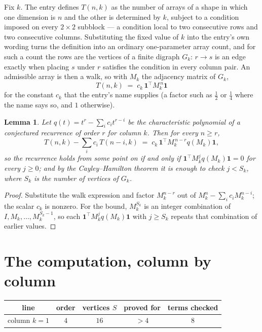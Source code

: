 \documentclass[11pt,a4paper]{article}
\theoremstyle{plain}
\newtheorem{lemma}[theorem]{Lemma}
\theoremstyle{definition}
\begin{document}
Fix $k$. The entry defines $T(n,k)$ as the number of arrays of a shape in which one dimension
is $n$ and the other is determined by $k$, subject to a condition imposed on every
$2\times2$ subblock --- a condition local to two consecutive rows and two consecutive columns.
Substituting the fixed value of $k$ into the entry's own wording turns the definition into an
ordinary one-parameter array count, and for such a count the rows are the vertices of a finite
digraph $G_k$: $r\to s$ is an edge exactly when placing $s$ under $r$ satisfies the condition
in every column pair. An admissible array is then a walk, so with $M_k$ the adjacency matrix
of $G_k$,
\[
T(n,k)\;=\;c_k\,\mathbf{1}^{\!\top}M_k^{\,n}\mathbf{1}
\]
for the constant $c_k$ that the entry's name supplies (a factor such as $\tfrac12$ or
$\tfrac14$ where the name says so, and $1$ otherwise).

\begin{lemma}\label{lem:crit}
Let $q(t)=t^{r}-\sum_i c_it^{r-i}$ be the characteristic polynomial of a conjectured
recurrence of order $r$ for column $k$. Then for every $n\ge r$,
\[
T(n,k)-\sum_i c_i\,T(n-i,k)\;=\;c_k\,\mathbf{1}^{\!\top}M_k^{\,n-r}q(M_k)\mathbf{1},
\]
so the recurrence holds from some point on if and only if
$\mathbf{1}^{\!\top}M_k^{j}q(M_k)\mathbf{1}=0$ for every $j\ge0$; and by the
Cayley--Hamilton theorem it is enough to check $j<S_k$, where $S_k$ is the number of vertices
of $G_k$.
\end{lemma}

\begin{proof}
Substitute the walk expression and factor $M_k^{n-r}$ out of $M_k^{n}-\sum_ic_iM_k^{n-i}$;
the scalar $c_k$ is nonzero. For the bound, $M_k^{S_k}$ is an integer combination of
$I,M_k,\dots,M_k^{S_k-1}$, so each $\mathbf{1}^{\!\top}M_k^{j}q(M_k)\mathbf{1}$ with
$j\ge S_k$ repeats that combination of earlier values.
\end{proof}

\section{The computation, column by column}

\begin{center}
\begin{tabular}{ccccc}
line & order & vertices $S$ & proved for & terms checked \\ \hline
column $k$$=1$ & $4$ & $16$ & $>4$ & $8$ \\
\end{tabular}
\end{center}
\end{document}
